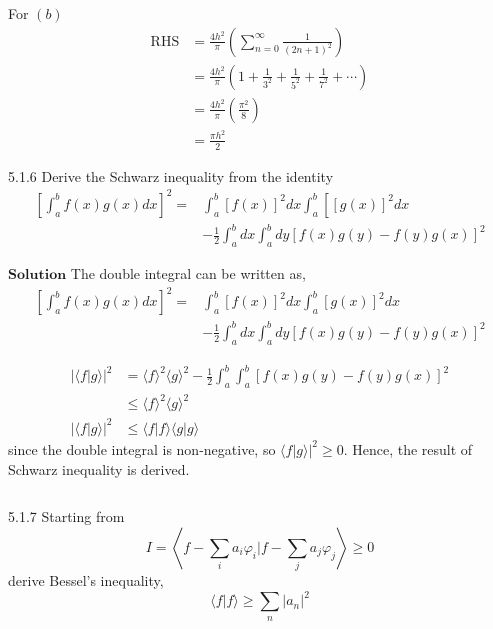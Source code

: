 For $(b)$ $$
\begin{aligned}
\mathrm{RHS} &=\frac{4 h^{2}}{\pi}\left(\sum_{n=0}^{\infty} \frac{1}{(2 n+1)^{2}}\right) \\
&=\frac{4 h^{2}}{\pi}\left(1+\frac{1}{3^{2}}+\frac{1}{5^{2}}+\frac{1}{7^{2}}+\cdots\right) \\
&=\frac{4 h^{2}}{\pi}\left(\frac{\pi^{2}}{8}\right) \\
&=\frac{\pi h^{2}}{2}
\end{aligned}
$$

\newpage


\begin{mybox}{5.1.6}
Derive the Schwarz inequality from the identity
$$
\begin{aligned}
\left[\int_{a}^{b} f(x) g(x) d x\right]^{2}=& \int_{a}^{b}[f(x)]^{2} d x \int_{a}^{b}\left[[g(x)]^{2} d x\right.\\
&-\frac{1}{2} \int_{a}^{b} d x \int_{a}^{b} d y[f(x) g(y)-f(y) g(x)]^{2}
\end{aligned}
$$
\end{mybox}

$\boxed{\textbf{Solution}}$ The double integral can be written as,
$$
\begin{aligned}
\left[\int_{a}^{b} f(x) g(x) d x\right]^{2}=& \int_{a}^{b}[f(x)]^{2} d x \int_{a}^{b}[g(x)]^{2} d x \\
&-\frac{1}{2} \int_{a}^{b} d x \int_{a}^{b} d y[f(x) g(y)-f(y) g(x)]^{2}
\end{aligned}
$$

$$
\begin{aligned}
|\langle f | g\rangle|^{2} &=\langle f\rangle^{2}\langle g\rangle^{2}-\frac{1}{2} \int_{a}^{b} \int_{a}^{b}[f(x) g(y)-f(y) g(x)]^{2} \\
& \leq\langle f\rangle^{2}\langle g\rangle^{2} \\
|\langle f | g\rangle|^{2} & \leq\langle f | f\rangle\langle g | g\rangle
\end{aligned}
$$
since the double integral is non-negative, so $\left.\langle f | g\rangle\right|^{2} \geq 0$.
Hence, the result of Schwarz inequality is derived.

$$$$


\begin{mybox}{5.1.7}
Starting from 
$$I=\left\langle f-\sum_{i} a_{i} \varphi_{i} | f-\sum_{j} a_{j} \varphi_{j}\right\rangle \geq 0$$
derive Bessel's inequality, 
$$\langle f | f\rangle \geq \sum_{n}\left|a_{n}\right|^{2}$$
\end{mybox}

